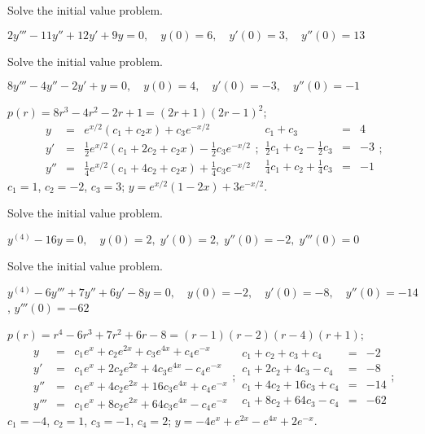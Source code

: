 \documentclass{ximera}
\begin{document}
\begin{problem}\label{exer:9.2.21}  Solve the
initial value problem.

$2y'''-11y''+12y'+9y=0, \quad  y(0)=6,\quad y'(0)=3,\quad y''(0)=13$
\end{problem}

\begin{problem}\label{exer:9.2.22}  Solve the
initial value problem.

$8y'''-4y''-2y'+y=0, \quad  y(0)=4,\quad y'(0)=-3,\quad y''(0)=-1$

\begin{solution}
$p(r)=8r^3-4r^2-2r+1=(2r+1)(2r-1)^2$;
$$
\begin{array}{lcl}
y&=&e^{x/2}(c_1+c_2x)+c_3e^{-x/2}\\
y'&=&\frac{1}{2}e^{x/2}(c_1+2c_2+c_2x)-\frac{1}{2}c_3e^{-x/2}\\
y''&=&\frac{1}{4}e^{x/2}(c_1+4c_2+c_2x)+\frac{1}{4}c_3e^{-x/2}
\end{array};
\begin{array}{rcr}
c_1+c_3&=&4\\
\frac{1}{2}c_1+c_2-\frac{1}{2}c_3&=&-3\\
\frac{1}{4}c_1+c_2+\frac{1}{4}c_3&=&-1
\end{array};
$$
$c_1=1$, $c_2=-2$, $c_3=3$;
 $y=e^{x/2}(1-2x)+3e^{-x/2}$.
\end{solution}
\end{problem}

\begin{problem}\label{exer:9.2.23}  Solve the
initial value problem.

$y^{(4)}-16y=0, \quad   y(0)=2,\;  y'(0)=2,\;  y''(0)=-2,\;  y'''(0)=0$
\end{problem}

\begin{problem}\label{exer:9.2.24}  Solve the
initial value problem.

$y^{(4)}-6y'''+7y''+6y'-8y=0, \quad  y(0)=-2,\quad y'(0)=-8,\quad y''(0)=-14$,
 $y'''(0)=-62$

\begin{solution}
$p(r)=r^4-6r^3+7r^2+6r-8=(r-1)(r-2)(r-4)(r+1)$;
$$
\begin{array}{lcl}
y&=&c_1e^x+c_2e^{2x}+c_3e^{4x}+c_4e^{-x}\\
y'&=&c_1e^x+2c_2e^{2x}+4c_3e^{4x}-c_4e^{-x}\\
y''&=&c_1e^x+4c_2e^{2x}+16c_3e^{4x}+c_4e^{-x}\\
y'''&=&c_1e^x+8c_2e^{2x}+64c_3e^{4x}-c_4e^{-x}
\end{array};
\begin{array}{rcr}
c_1+c_2+c_3+c_4&=&-2\\
c_1+2c_2+4c_3-c_4&=&-8\\
c_1+4c_2+16c_3+c_4&=&-14\\
c_1+8c_2+64c_3-c_4&=&-62
\end{array};
$$
$c_1=-4$, $c_2=1$, $c_3=-1$, $c_4=2$;
 $y=-4e^x+e^{2x}-e^{4x}+2e^{-x}$.
\end{solution}
\end{problem}
\end{document}
